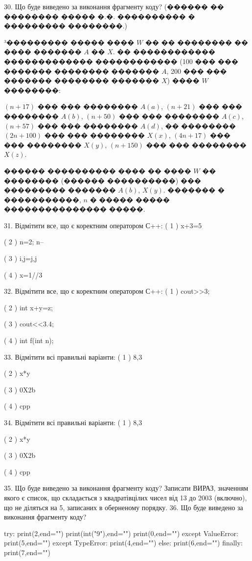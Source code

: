 \documentclass[11pt]{article}
\begin{document}
30. Що буде виведено за виконання фрагменту коду?
(������ �� �������� ����� �.�. ���������� � ��������� ��������.)\par {\hspace {0.5 cm}}³��������� ����� ���� $W$ �� �� �������� �� ���� ������� $A$ �� $X$. �� ������������ ������������� ������������ (100 ��� ��� ������� �������� ������� $A$,  200 ��� ��� ������� �������� ������� $X$) ���� $W$ ��������:\par {\hspace {0.5 cm}}$(n+17)$ ��� ��� �������� $A(a)$, $(n+21)$ ��� ��� �������� $A(b)$, $(n+50)$ ��� ��� �������� $A(c)$, $(n+57)$ ��� ��� �������� $A(d)$, �� �������� $(2n+100)$ ��� ��� �������� $X(x)$, $(4n+17)$ ��� ��� �������� $X(y)$, $(n+150)$ ��� ��� �������� $X(z)$.\par
{\hspace {0.5 cm}}������ ���������� ���� �� ���� $W$ �� �������� (������ ����������) ��� ��������� ������� $A(b)$, $X(y)$. ������� � �����������, $n$ � ����� ����� ��������������� �����.\par
31. Відмітити все, що є коректним оператором С++:
( 1 ) x+3=5

( 2 ) n=2; n--

( 3 ) i,j=j,j

( 4 ) x=1//3

32. Відмітити все, що є коректним оператором С++:
( 1 ) cout>>3;

( 2 ) int x+y=z;

( 3 ) cout<<3.4;

( 4 ) int f(int n);

33. Відмітити всі правильні варіанти:
( 1 ) 8,3

( 2 ) x*y

( 3 ) 0X2b

( 4 ) cpp

34. Відмітити всі правильні варіанти:
( 1 ) 8,3

( 2 ) x*y

( 3 ) 0X2b

( 4 ) cpp

35. Що буде виведено за виконання фрагменту коду?
Записати ВИРАЗ, значенням якого є список, що складається з квадратівцілих чисел від 13 до 2003 (включно), що не діляться на 5, записаних в оберненому порядку.
36. Що буде виведено за виконання фрагменту коду?

try:
    print(2,end="")
    print(int("9"),end="")
    print(0,end="")
except ValueError: print(5,end="")
except TypeError: print(4,end="")
else: print(6,end="")
finally: print(7,end="")
\end{document}
